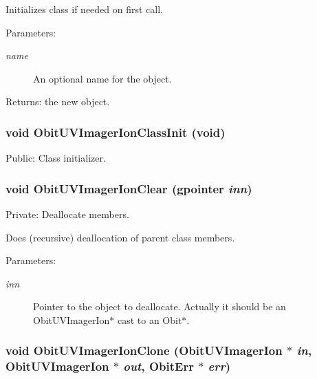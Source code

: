 Initializes class if needed on first call. \begin{Desc}
\item[Parameters:]
\begin{description}
\item[{\em name}]An optional name for the object. \end{description}
\end{Desc}
\begin{Desc}
\item[Returns:]the new object. \end{Desc}
\subsubsection{\setlength{\rightskip}{0pt plus 5cm}void Obit\-UVImager\-Ion\-Class\-Init (void)}\label{ObitUVImagerIon_8c_a18}


Public: Class initializer. 

\subsubsection{\setlength{\rightskip}{0pt plus 5cm}void Obit\-UVImager\-Ion\-Clear (gpointer {\em inn})}\label{ObitUVImagerIon_8c_a4}


Private: Deallocate members. 

Does (recursive) deallocation of parent class members. \begin{Desc}
\item[Parameters:]
\begin{description}
\item[{\em inn}]Pointer to the object to deallocate. Actually it should be an Obit\-UVImager\-Ion$\ast$ cast to an Obit$\ast$. \end{description}
\end{Desc}
\subsubsection{\setlength{\rightskip}{0pt plus 5cm}void Obit\-UVImager\-Ion\-Clone ({\bf Obit\-UVImager\-Ion} $\ast$ {\em in}, {\bf Obit\-UVImager\-Ion} $\ast$ {\em out}, {\bf Obit\-Err} $\ast$ {\em err})}\label{ObitUVImagerIon_8c_a10}


